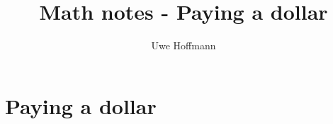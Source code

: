 

\title{Math notes - Paying a dollar}
\author{Uwe Hoffmann}



\setcounter{chapter}{0}
\chapter{Paying a dollar}
